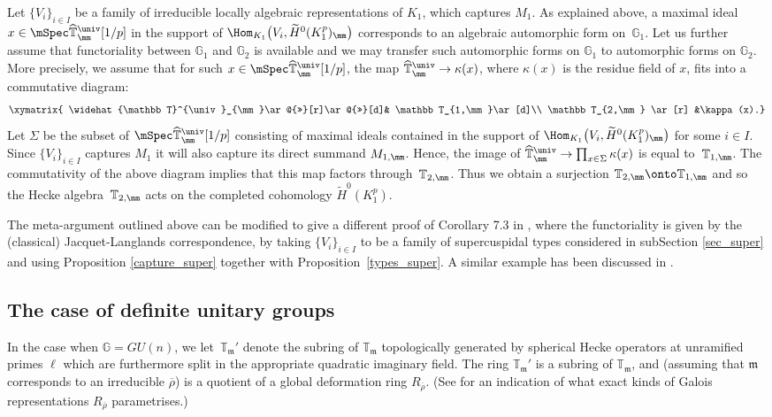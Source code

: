 Let $\{V_i\}_{i\in I}$ be a family of irreducible locally algebraic representations of $K_1$, which captures $M_1$.
As explained above, a maximal ideal $x\in \mSpec \widehat{\mathbb T}^{\univ}_{\mm}[1/p]$ in the
support of $\Hom_{ K_1} \bigl(V_i, \widetilde{H}^0(K_1^p)_{\mm}\bigr)$ corresponds to an algebraic
automorphic form on~$\mathbb G_1$. Let us further assume that functoriality between
$\mathbb G_1$ and $\mathbb G_2$ is available and we may transfer such automorphic forms
on $\mathbb G_1$ to automorphic forms on $\mathbb G_2$. More precisely, we assume that
for such $x\in \mSpec \widehat{\mathbb T}^{\univ}_{\mm}[1/p]$, the map $ \widehat{\mathbb T}^{\univ}_{\mm}\to \kappa(x)$, where $\kappa(x)$ is the residue field of $x$, fits into a commutative diagram:
\begin{displaymath}
\xymatrix{ \widehat{\mathbb T}^{\univ}_{\mm}\ar@{>>}[r]\ar@{>>}[d]& \mathbb T_{1,\mm}\ar[d]\\
\mathbb T_{2,\mm} \ar[r] &\kappa(x).}
\end{displaymath}
Let $\Sigma$ be the subset of $\mSpec \widehat{\mathbb T}^{\univ}_{\mm}[1/p]$ consisting of maximal ideals contained in the support of $\Hom_{ K_1} \bigl(V_i, \widetilde{H}^0(K_1^p)_{\mm}\bigr)$
for some $i\in I$. Since $\{V_i\}_{i\in I}$ captures $M_1$ it will also capture its direct summand
$M_{1, \mm}$. Hence, the image of $\widehat{\mathbb T}^{\univ}_{\mm} \to \prod_{x\in \Sigma} \kappa(x)$ is equal to~$\mathbb T_{1, \mm}$. The commutativity of the above diagram implies that this map factors through~$\mathbb T_{2, \mm}$. Thus we obtain a surjection
$\mathbb T_{2, \mm}\onto \mathbb T_{1, \mm}$ and so the Hecke algebra~$\mathbb T_{2, \mm}$ acts on the completed cohomology $\widetilde{H}^0(K^p_1)$.

The meta-argument outlined above can be modified to give a different proof of Corollary 7.3 in
\cite{scholze}, where the functoriality is given by the (classical) Jacquet-Langlands correspondence, by
taking $\{V_i\}_{i\in I}$ to be a family of supercuspidal types considered in subSection \ref{sec_super} and
using Proposition \ref{capture_super} together with Proposition~\ref{types_super}. A similar example has
been discussed in \cite[ \S 3.3.2]{matt_icm}.

\subsection{The case of definite unitary groups}
In the case when $\mathbb G = GU(n)$,
we let~$\mathbb T_{\mathfrak m}'$ denote the subring
of $\mathbb T_{\mathfrak m}$
topologically generated by spherical Hecke operators
at unramified primes $\ell$ which are furthermore split
in the appropriate quadratic imaginary field.
The ring $\mathbb T_{\mathfrak m}'$ is a subring
of $\mathbb T_{\mathfrak m}$,
and (assuming that $\mathfrak m$ corresponds to an irreducible
$\overline{\rho}$) is a quotient
of a global deformation ring $R_{\overline{\rho}}$.
(See \cite[\S 2.4]{six-authors} for an indication of what exact
kinds of Galois representations $R_{\overline{\rho}}$ parametrises.)

